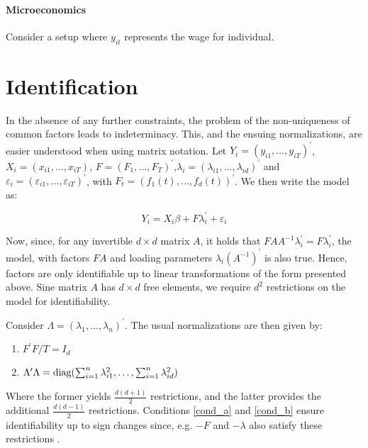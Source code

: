 \paragraph{Microeconomics} Consider a setup where $y_{it}$ represents the wage for individual.

\section{Identification}\label{identification}

In the absence of any further constraints, the problem of the non-uniqueness of common factors leads to indeterminacy. This, and the ensuing normalizations, are easier understood when using matrix notation. Let $Y_i = (y_{i1}, \ldots, y_{iT})^\prime$, $X_i = (x_{i1}, \ldots, x_{iT})$, $F = (F_1,  \ldots, F_T)^\prime$,$ \lambda_i = (\lambda_{i 1}, \ldots, \lambda_{i d})^\prime$ and $\varepsilon_{i} = (\varepsilon_{i1}, \ldots, \varepsilon_{iT})^\prime$, with  $F_t = (f_1(t), \ldots, f_d(t))^\prime$. We then write the model as:

\begin{equation}\label{matrix_notation}
    Y_i=X_i \beta+ F\lambda_i^\prime +\varepsilon_i
\end{equation}

 

Now, since, for any invertible  $d \times d$ matrix $A$, it holds that $ F A A^{-1} \lambda_i^\prime  =  F \lambda_i^\prime$, the model, with factors $FA$ and loading parameters $\lambda_i (A^{-1})^\prime$ is also true. Hence, factors are only identifiable up to linear transformations of the form presented above. Sine matrix $A$ has $d \times d$ free elements, we require $d^2$ restrictions on the model for identifiability. 


Consider $\Lambda = (\lambda_1, \ldots, \lambda_n)^\prime$. The usual normalizations are then given by:   

\begin{enumerate}[label = (\alph*)]
    \item $F^\prime F/T = I_d$ \label{cond_a}
    \item $\Lambda^\prime \Lambda = \operatorname{\text{diag}}(\sum_{i=1}^n \lambda_{i1}^2, \ldots, \sum_{i=1}^n \lambda_{id}^2 ) $ \label{cond_b}
\end{enumerate}



Where the former yields $\frac{d(d+1)}{2}$ restrictions, and the latter provides the additional $\frac{d(d-1)}{2}$ restrictions. Conditions \ref{cond_a} and \ref{cond_b} ensure identifiability up to sign changes since, e.g. $-F$ and $-\lambda$ also satisfy these restrictions \citep{bai2009panel, kneip2012new}.

